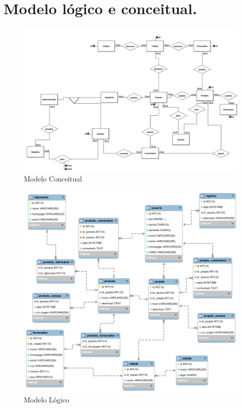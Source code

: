 \documentclass[12pt,a4paper]{article}
\begin{document}
\section{Modelo lógico e conceitual.}
\begin{figure}[ht!]
\centering
\includegraphics[width=180mm]{BD_conceitual.jpg}
\caption{Modelo Conceitual}
\label{overflow}
\end{figure}

\newpage

\begin{figure}[ht!]
\centering
\includegraphics[width=180mm]{Modelo_fisico.png}
\caption{Modelo Lógico}
\label{overflow}
\end{figure}
\end{document}
